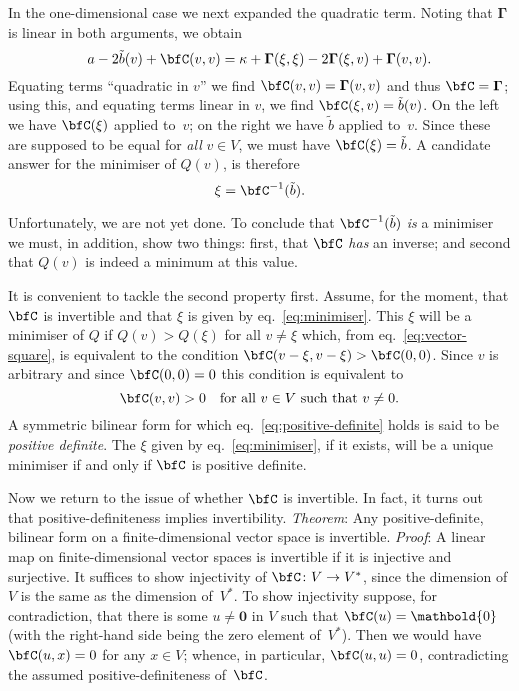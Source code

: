 \documentclass[10pt, a4paper]{article}
\newcommand{\bzero}{\mathbold{0}} %
\begin{document}
In the one-dimensional case we next expanded the quadratic
term. Noting that $\bm{\Gamma}$ is linear in both arguments, we obtain
\[
  a -2\tilde{b}(v)+\bfC(v,v) = \kappa+\bm{\Gamma}(\xi,\xi) -2\bm{\Gamma}(\xi,v) + \bm{\Gamma}(v,v).
\]
Equating terms ``quadratic in $v$'' we find
$\bm{\bfC}(v,v) = \bm{\Gamma}(v,v)$ and thus $\bfC=\bm{\Gamma}$; using this, and
equating terms linear in $v$, we find $\bfC(\xi, v) = \tilde{b}(v)$. On
the left we have $\bfC(\xi)$ applied to~$v$; on the right we have
$\tilde{b}$ applied to~$v$. Since these are supposed to be equal for
\emph{all} $v\in V$, we must have $\bfC(\xi) = \tilde{b}$. A candidate
answer for the minimiser of $Q(v)$, is therefore
\begin{equation}
  \label{eq:minimiser}
  \xi = \bfC^{-1}(\tilde{b}).
\end{equation}

Unfortunately, we are not yet done. To conclude that
$\bfC^{-1}(\tilde{b})$ \emph{is} a minimiser we must, in addition,
show two things: first, that $\bfC$ \emph{has} an inverse; and second
that $Q(v)$ is indeed a minimum at this value.

It is convenient to tackle the second property first. Assume, for the
moment, that $\bfC$ is invertible and that $\xi$ is given by
eq.~\eqref{eq:minimiser}. This $\xi$ will be a minimiser of $Q$ if
$Q(v)>Q(\xi)$ for all $v \neq \xi$ which, from eq.~\eqref{eq:vector-square},
is equivalent to the condition $\bfC(v-\xi,v-\xi)>\bfC(0,0)$. Since
$v$ is arbitrary and since $\bfC(0,0)=0$ this condition is equivalent
to
\begin{equation}
  \label{eq:positive-definite}
  \bfC(v,v) > 0 \quad\text{for all $v\in V$ such that $v\neq0$}.
\end{equation}
A symmetric bilinear form for which eq.~\eqref{eq:positive-definite}
holds is said to be \emph{positive definite}. The $\xi$ given by
eq.~\eqref{eq:minimiser}, if it exists, will be a unique minimiser if
and only if $\bfC$ is positive definite.

Now we return to the issue of whether $\bfC$ is invertible. In fact,
it turns out that positive-definiteness implies
invertibility. \emph{Theorem}: Any positive-definite, bilinear form on
a finite-dimensional vector space is invertible. \emph{Proof}: A
linear map on finite-dimensional vector spaces is invertible if it is
injective and surjective. It suffices to show injectivity of
$\bfC\colon V\to V^*$, since the dimension of $V$ is the same as the
dimension of~$V^*$. To show injectivity suppose, for contradiction,
that there is some $u\neq\bzero$ in $V$ such that $\bfC(u)=\bzero$ (with
the right-hand side being the zero element of~$V^*$). Then we would
have $\bfC(u, x) = 0$ for any $x\in V$; whence, in particular,
$\bfC(u,u)=0$, contradicting the assumed positive-definiteness
of~$\bfC$.
\end{document}
